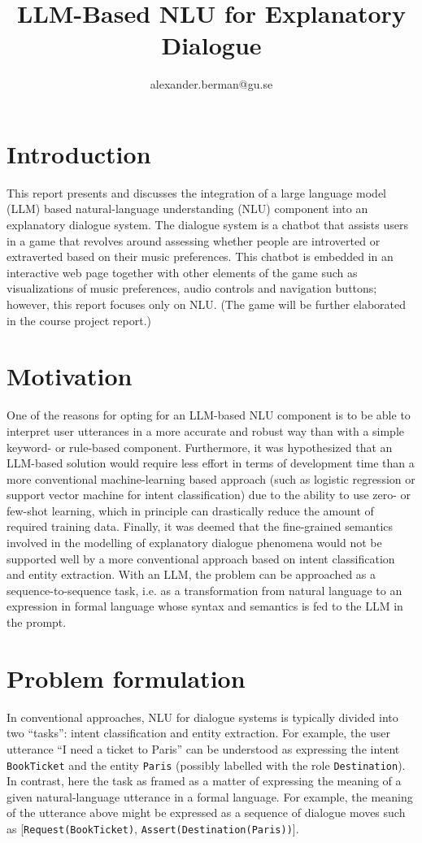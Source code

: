 \documentclass[11pt]{article}
\title{LLM-Based NLU for Explanatory Dialogue}
\author{alexander.berman@gu.se}
\begin{document}
\maketitle

\section{Introduction}
This report presents and discusses the integration of a large language model (LLM) based natural-language understanding (NLU) component into an explanatory dialogue system. The dialogue system is a chatbot that assists users in a game that revolves around assessing whether people are introverted or extraverted based on their music preferences. This chatbot is embedded in an interactive web page together with other elements of the game such as visualizations of music preferences, audio controls and navigation buttons; however, this report focuses only on NLU. (The game will be further elaborated in the course project report.)

\section{Motivation}
One of the reasons for opting for an LLM-based NLU component is to be able to interpret user utterances in a more accurate and robust way than with a simple keyword- or rule-based component. Furthermore, it was hypothesized that an LLM-based solution would require less effort in terms of development time than a more conventional machine-learning based approach (such as logistic regression or support vector machine for intent classification) due to the ability to use zero- or few-shot learning, which in principle can drastically reduce the amount of required training data. Finally, it was deemed that the fine-grained semantics involved in the modelling of explanatory dialogue phenomena would not be supported well by a more conventional approach based on intent classification and entity extraction. With an LLM, the problem can be approached as a sequence-to-sequence task, i.e. as a transformation from natural language to an expression in formal language whose syntax and semantics is fed to the LLM in the prompt.

\section{Problem formulation}
In conventional approaches, NLU for dialogue systems is typically divided into two ``tasks'': intent classification and entity extraction. For example, the user utterance ``I need a ticket to Paris'' can be understood as expressing the intent \texttt{BookTicket} and the entity \texttt{Paris} (possibly labelled with the role \texttt{Destination}). In contrast, here the task as framed as a matter of expressing the meaning of a given natural-language utterance in a formal language. For example, the meaning of the utterance above might be expressed as a sequence of dialogue moves such as [\texttt{Request(BookTicket)}, \texttt{Assert(Destination(Paris))}].
\end{document}

